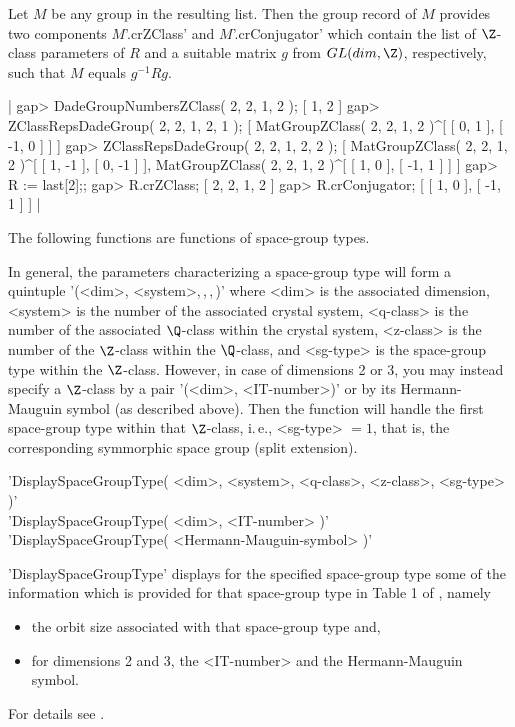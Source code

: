 Let $M$ be any group in the resulting list.  Then the group record of $M$
provides   two components  $M$'.crZClass'   and $M$'.crConjugator'  which
contain the list  of $\Z$-class  parameters of $R$  and a suitable matrix
$g$ from $GL(dim,\Z)$,  respectively,  such that $M$ equals $g^{-1} R g$.

|    gap> DadeGroupNumbersZClass( 2, 2, 1, 2 );
    [ 1, 2 ]
    gap> ZClassRepsDadeGroup( 2, 2, 1, 2, 1 );
    [ MatGroupZClass( 2, 2, 1, 2 )^[ [ 0, 1 ], [ -1, 0 ] ] ]
    gap> ZClassRepsDadeGroup( 2, 2, 1, 2, 2 );
    [ MatGroupZClass( 2, 2, 1, 2 )^[ [ 1, -1 ], [ 0, -1 ] ],
      MatGroupZClass( 2, 2, 1, 2 )^[ [ 1, 0 ], [ -1, 1 ] ] ]
    gap> R := last[2];;
    gap> R.crZClass;
    [ 2, 2, 1, 2 ]
    gap> R.crConjugator;
    [ [ 1, 0 ], [ -1, 1 ] ] |

\vspace{5mm}
The following functions are functions of space-group types.

In general, the parameters characterizing a space-group  type will form a
quintuple '(<dim>,  <system>,\,<q-class>,\,<z-class>,\,<sg-type>)'  where
<dim>  is  the   associated dimension,  <system>  is the   number  of the
associated crystal system, <q-class> is    the number of the   associated
$\Q$-class  within  the  crystal system, <z-class> is  the  number of the
$\Z$-class  within the $\Q$-class,  and <sg-type> is the space-group type
within  the $\Z$-class.  However, in  case of dimensions  2 or 3, you may
instead specify a $\Z$-class  by a pair  '(<dim>, <IT-number>)' or by its
Hermann-Mauguin  symbol (as  described  above).  Then  the  function will
handle the  first  space-group   type within that    $\Z$-class,  i.\,e.,
<sg-type> $= 1$, that is, the corresponding symmorphic space group (split
extension).

\vspace{5mm}
'DisplaySpaceGroupType( <dim>,  <system>, <q-class>, <z-class>, <sg-type>
)'%
 \\
'DisplaySpaceGroupType( <dim>, <IT-number> )' \\
'DisplaySpaceGroupType( <Hermann-Mauguin-symbol> )'

'DisplaySpaceGroupType' displays for  the specified space-group type some
of the information which is provided for that space-group type in Table 1
of \cite{BBNWZ78}, namely
\vspace{-2mm}
\begin{itemize}
\item the orbit size associated with that space-group type and,
      \vspace{-2mm}
\item for dimensions  2 and 3,  the <IT-number>  and  the Hermann-Mauguin
      symbol.
      \vspace{-2mm}
\end{itemize}
For details see \cite{BBNWZ78}.

